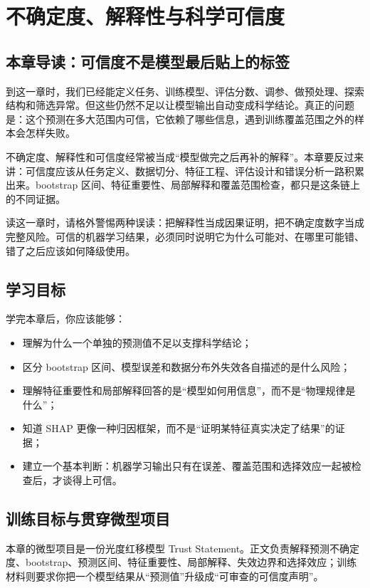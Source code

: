 \chapter{不确定度、解释性与科学可信度}

\section{本章导读：可信度不是模型最后贴上的标签}

到这一章时，我们已经能定义任务、训练模型、评估分数、调参、做预处理、探索结构和筛选异常。但这些仍然不足以让模型输出自动变成科学结论。真正的问题是：这个预测在多大范围内可信，它依赖了哪些信息，遇到训练覆盖范围之外的样本会怎样失败。

不确定度、解释性和可信度经常被当成“模型做完之后再补的解释”。本章要反过来讲：可信度应该从任务定义、数据切分、特征工程、评估设计和错误分析一路积累出来。bootstrap 区间、特征重要性、局部解释和覆盖范围检查，都只是这条链上的不同证据。

读这一章时，请格外警惕两种误读：把解释性当成因果证明，把不确定度数字当成完整风险。可信的机器学习结果，必须同时说明它为什么可能对、在哪里可能错、错了之后应该如何降级使用。

\section{学习目标}

学完本章后，你应该能够：

\begin{itemize}
    \item 理解为什么一个单独的预测值不足以支撑科学结论；
    \item 区分 bootstrap 区间、模型误差和数据分布外失效各自描述的是什么风险；
    \item 理解特征重要性和局部解释回答的是“模型如何用信息”，而不是“物理规律是什么”；
    \item 知道 SHAP 更像一种归因框架，而不是“证明某特征真实决定了结果”的证据；
    \item 建立一个基本判断：机器学习输出只有在误差、覆盖范围和选择效应一起被检查后，才谈得上可信。
\end{itemize}

\section{训练目标与贯穿微型项目}

本章的微型项目是一份光度红移模型 Trust Statement。正文负责解释预测不确定度、bootstrap、预测区间、特征重要性、局部解释、失效边界和选择效应；训练材料则要求你把一个模型结果从“预测值”升级成“可审查的可信度声明”。


